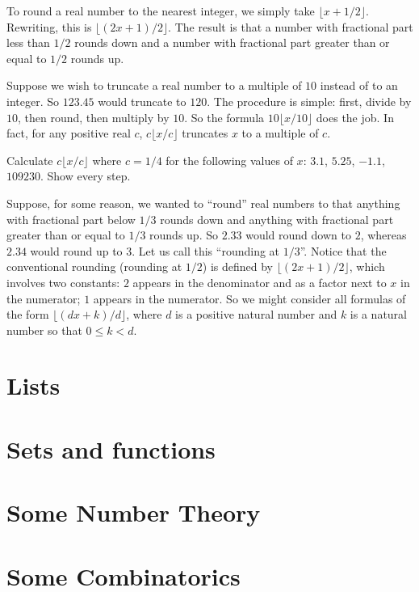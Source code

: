 \documentclass[10pt,oneside,tightlist]{memoir}
\begin{document}
To round a real number to the nearest integer, we simply take $\lfloor x+1/2\rfloor$. Rewriting, this is $\lfloor (2x+1)/2\rfloor$.
The result is that a number with fractional part less than $1/2$ rounds down and a number with fractional part greater than or equal to $1/2$ rounds up.

Suppose we wish to truncate a real number to a multiple of $10$ instead of to an integer. So $123.45$ would truncate to $120$.
The procedure is simple:  first, divide by $10$, then round, then multiply by $10$. So the formula $10\lfloor x/10\rfloor$ does the job.
In fact, for any positive real $c$, $c\lfloor x/c\rfloor$ truncates $x$ to a multiple of $c$.  

\begin{exercise}
  Calculate $c\lfloor x/c\rfloor$ where $c = 1/4$ for the following values of $x$: $3.1$, $5.25$, $-1.1$, $109230$. Show every step.
\end{exercise}

Suppose, for some reason, we wanted to ``round'' real numbers to that anything with fractional part below $1/3$ rounds down and
anything with fractional part greater than or equal to $1/3$ rounds up. So $2.33$ would round down to $2$, whereas $2.34$ would round up to $3$. Let us call this ``rounding at $1/3$''. Notice that the conventional rounding (rounding at $1/2$)
is defined by $\lfloor (2x+1)/2\rfloor$, which involves two constants: $2$ appears in the denominator
and as a factor next to $x$ in the numerator; $1$ appears in the numerator. So we might consider all formulas of the form $\lfloor (dx + k)/d\rfloor$,
where $d$ is a positive natural number and $k$ is a natural number so that $0\leq k < d$.

\chapter{Lists}

\chapter{Sets and functions}

\chapter{Some Number Theory}

\chapter{Some Combinatorics}
\end{document}
